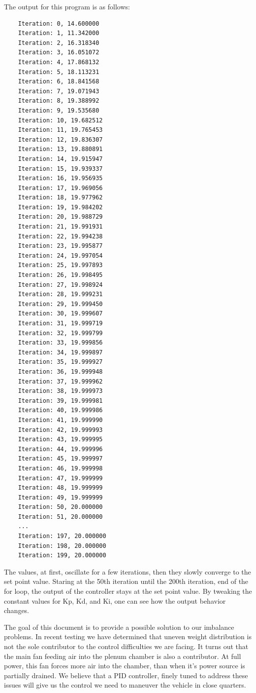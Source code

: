 The output for this program is as follows:
\begin{verbatim}
	Iteration: 0, 14.600000
	Iteration: 1, 11.342000
	Iteration: 2, 16.318340
	Iteration: 3, 16.051072
	Iteration: 4, 17.868132
	Iteration: 5, 18.113231
	Iteration: 6, 18.841568
	Iteration: 7, 19.071943
	Iteration: 8, 19.388992
	Iteration: 9, 19.535680
	Iteration: 10, 19.682512
	Iteration: 11, 19.765453
	Iteration: 12, 19.836307
	Iteration: 13, 19.880891
	Iteration: 14, 19.915947
	Iteration: 15, 19.939337
	Iteration: 16, 19.956935
	Iteration: 17, 19.969056
	Iteration: 18, 19.977962
	Iteration: 19, 19.984202
	Iteration: 20, 19.988729
	Iteration: 21, 19.991931
	Iteration: 22, 19.994238
	Iteration: 23, 19.995877
	Iteration: 24, 19.997054
	Iteration: 25, 19.997893
	Iteration: 26, 19.998495
	Iteration: 27, 19.998924
	Iteration: 28, 19.999231
	Iteration: 29, 19.999450
	Iteration: 30, 19.999607
	Iteration: 31, 19.999719
	Iteration: 32, 19.999799
	Iteration: 33, 19.999856
	Iteration: 34, 19.999897
	Iteration: 35, 19.999927
	Iteration: 36, 19.999948
	Iteration: 37, 19.999962
	Iteration: 38, 19.999973
	Iteration: 39, 19.999981
	Iteration: 40, 19.999986
	Iteration: 41, 19.999990
	Iteration: 42, 19.999993
	Iteration: 43, 19.999995
	Iteration: 44, 19.999996
	Iteration: 45, 19.999997
	Iteration: 46, 19.999998
	Iteration: 47, 19.999999
	Iteration: 48, 19.999999
	Iteration: 49, 19.999999
	Iteration: 50, 20.000000
	Iteration: 51, 20.000000
	...
	Iteration: 197, 20.000000
	Iteration: 198, 20.000000
	Iteration: 199, 20.000000
\end{verbatim}

The values, at first, oscillate for a few iterations, then they slowly converge to the set point value. Staring at the 50th iteration until the 200th iteration, end of the for loop, the output of the controller stays at the set point value. By tweaking the constant values for Kp, Kd, and Ki, one can see how the output behavior changes. 

The goal of this document is to provide a possible solution to our imbalance problems. In recent testing we have determined that uneven weight distribution is not the sole contributor to the control difficulties we are facing. It turns out that the main fan feeding air into the plenum chamber is also a contributor. At full power, this fan forces more air into the chamber, than when it's power source is partially drained. We believe that a PID controller, finely tuned to address these issues will give us the control we need to maneuver the vehicle in close quarters.